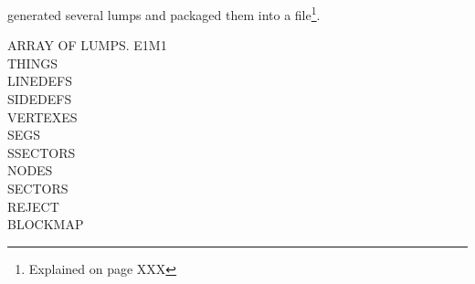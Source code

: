 \pagebreak
{}
\par
{} generated several lumps and packaged them into a  file\footnote{Explained on page XXX}.
\par
ARRAY OF LUMPS.
E1M1\\
THINGS\\
LINEDEFS\\
SIDEDEFS\\
VERTEXES\\
SEGS\\
SSECTORS\\
NODES\\
SECTORS\\
REJECT\\
BLOCKMAP\\
\par
{}
\par
